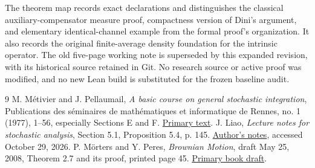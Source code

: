 \documentclass[11pt]{article}
\theoremstyle{remark}\newtheorem{remark}[theorem]{Remark}
\begin{document}
The theorem map records exact declarations and distinguishes the
classical auxiliary-compensator measure proof, compactness version of
Dini's argument, and elementary identical-channel example from the
formal proof's organization. It also records the original
finite-average density foundation for the intrinsic operator. The old
five-page working note is superseded by this expanded revision, with
its historical source retained in Git. No research source or active
proof was modified, and no new Lean build is substituted for the
frozen baseline audit.
\par\endgroup

\begin{thebibliography}{9}
 M. M\'etivier and J. Pellaumail,
\emph{A basic course on general stochastic integration},
Publications des s\'eminaires de math\'ematiques et informatique de Rennes,
no. 1 (1977), 1--56, especially Sections E and F.
\href{https://www.numdam.org/item/PSMIR_1977___1_1_0/}{Primary text}.
 J. Liao, \emph{Lecture notes for stochastic analysis},
Section 5.1, Proposition 5.4, p. 145.
\href{https://jurrivhleon.github.io/notes/stochastic_analysis.pdf}{Author's notes},
accessed October 29, 2026.
 P. M\"orters and Y. Peres, \emph{Brownian Motion}, draft May 25, 2008, Theorem 2.7 and its proof, printed page 45. \href{https://www.stat.berkeley.edu/users/aldous/205B/bmbook.pdf}{Primary book draft}.
\end{thebibliography}
\end{document}
